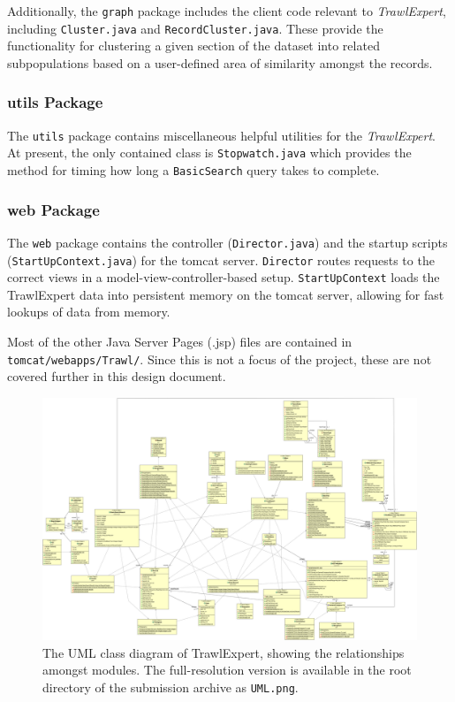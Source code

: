 \documentclass{article}
\begin{document}
Additionally, the \texttt{graph} package includes the client code relevant to \textit{TrawlExpert}, including \texttt{Cluster.java} and \texttt{RecordCluster.java}. These provide the functionality for clustering a given section of the dataset into related subpopulations based on a user-defined area of similarity amongst the records.

\subsubsection{utils Package}
The \texttt{utils} package contains miscellaneous helpful utilities for the \textit{TrawlExpert}. At present, the only contained class is \texttt{Stopwatch.java} which provides the method for timing how long a \texttt{BasicSearch} query takes to complete.

\subsubsection{web Package}
The \texttt{web} package contains the controller (\texttt{Director.java}) and the startup scripts (\texttt{StartUpContext.java}) for the tomcat server. \texttt{Director} routes requests to the correct views in a model-view-controller-based setup. \texttt{StartUpContext} loads the TrawlExpert data into persistent memory on the tomcat server, allowing for fast lookups of data from memory. 

Most of the other Java Server Pages (.jsp) files are contained in \texttt{tomcat/webapps/Trawl/}. Since this is not a focus of the project, these are not covered further in this design document.

\begin{figure}
\centering
\includegraphics[angle=90,width=14cm]{ClassUML.png}
\caption{The UML class diagram of TrawlExpert, showing the relationships amongst modules. The full-resolution version is available in the root directory of the submission archive as \texttt{UML.png}.}
\label{fig:UML}
\end{figure}
\end{document}
